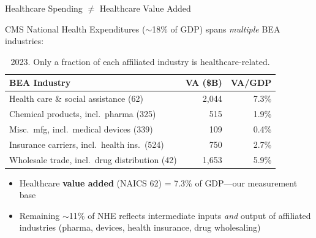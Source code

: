 \begin{frame}{Healthcare Spending $\neq$ Healthcare Value Added}

{\small CMS National Health Expenditures ($\sim$18\% of GDP) spans \emph{multiple} BEA industries:}

\vspace{-4pt}
\begin{table}
\centering
\footnotesize
\setlength{\tabcolsep}{5pt}
\begin{tabular}{lrr}
\toprule
BEA Industry & VA (\$B) & VA/GDP \\
\midrule
Health care \& social assistance (62) & 2,044 & 7.3\% \\
Chemical products, incl.\ pharma (325) & 515 & 1.9\% \\
Misc.\ mfg, incl.\ medical devices (339) & 109 & 0.4\% \\
Insurance carriers, incl.\ health ins.\ (524) & 750 & 2.7\% \\
Wholesale trade, incl.\ drug distribution (42) & 1,653 & 5.9\% \\
\bottomrule
\end{tabular}
\caption*{\footnotesize 2023. Only a fraction of each affiliated industry is healthcare-related.}
\end{table}

\vspace{-6pt}
\small
\begin{itemize}\setlength{\itemsep}{0pt}
    \item Healthcare \textbf{value added} (NAICS 62) = 7.3\% of GDP---our measurement base
    \item Remaining $\sim$11\% of NHE reflects intermediate inputs \emph{and} output of affiliated industries (pharma, devices, health insurance, drug wholesaling)
\end{itemize}

\end{frame}

